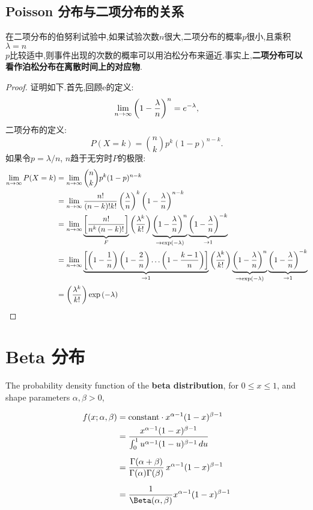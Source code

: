 \documentclass{article}
\begin{document}
\subsection{Poisson 分布与二项分布的关系}
在二项分布的伯努利试验中,如果试验次数$n$很大,二项分布的概率$p$很小,且乘积$\lambda = n$ \\$p$比较适中,则事件出现的次数的概率可以用泊松分布来逼近.事实上,\textbf{二项分布可以看作泊松分布在离散时间上的对应物}.
\begin{proof}
证明如下.首先,回顾e的定义:
$$
\lim _{{n\to \infty }}\left(1-{\lambda  \over n}\right)^{n}=e^{{-\lambda }},
$$
二项分布的定义:
$$
P(X=k)={n \choose k}p^{k}(1-p)^{{n-k}}.
$$
如果令$p=\lambda /n$, $n$趋于无穷时$P$的极限:
$$
\begin{aligned}
\lim_{{n \to \infty }}P(X=k) & =\lim _{{n\to \infty }}{n \choose k}p^{k}(1-p)^{{n-k}}\\
& = \lim _{{n\to \infty }}{n! \over (n-k)!k!}\left({\lambda \over n}\right)^{k}\left(1-{\lambda \over n}\right)^{{n-k}}\\
& = \lim _{{n\to \infty }}\underbrace {\left[{\frac {n!}{n^{k}\left(n-k\right)!}}\right]}_{F}\left({\frac {\lambda ^{k}}{k!}}\right)\underbrace {\left(1-{\frac {\lambda }{n}}\right)^{n}}_{{\to \exp \left(-\lambda \right)}}\underbrace {\left(1-{\frac {\lambda }{n}}\right)^{{-k}}}_{{\to 1}}\\
& = \lim _{{n\to \infty }}\underbrace {\left[\left(1-{\frac {1}{n}}\right)\left(1-{\frac {2}{n}}\right)\ldots \left(1-{\frac {k-1}{n}}\right)\right]}_{{\to 1}}\left({\frac {\lambda ^{k}}{k!}}\right)\underbrace {\left(1-{\frac {\lambda }{n}}\right)^{n}}_{{\to \exp \left(-\lambda \right)}}\underbrace {\left(1-{\frac {\lambda }{n}}\right)^{{-k}}}_{{\to 1}}\\
& = \left({\frac {\lambda ^{k}}{k!}}\right)\exp \left(-\lambda \right)
\end{aligned}
$$
\end{proof}

\section{Beta 分布}
The probability density function of the \textbf{beta distribution}, for $0 \leq x \leq 1$, and shape parameters $\alpha, \beta > 0$, 

$$
\begin{align}
f(x;\alpha,\beta) & = \mathrm{constant}\cdot x^{\alpha-1}(1-x)^{\beta-1} \\
& = \frac{x^{\alpha-1}(1-x)^{\beta-1}}{\int_0^1 u^{\alpha-1} (1-u)^{\beta-1}\, du} \\[6pt]
& = \frac{\Gamma(\alpha+\beta)}{\Gamma(\alpha)\Gamma(\beta)}\, x^{\alpha-1}(1-x)^{\beta-1} \\[6pt]
& = \frac{1}{\Beta(\alpha,\beta)} x^{\alpha-1}(1-x)^{\beta-1}
\end{align}
$$
\end{document}
